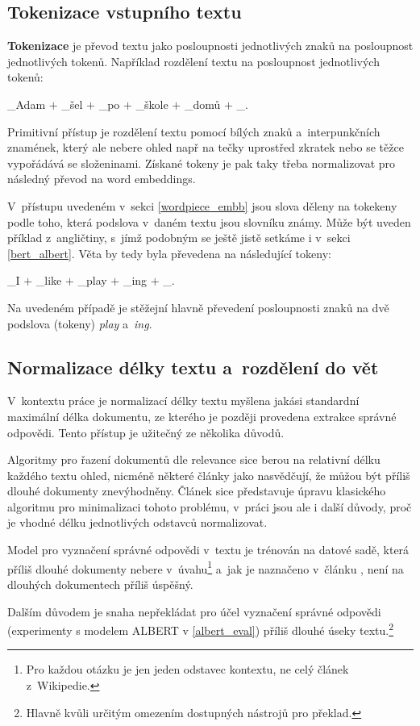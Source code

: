 \subsection{Tokenizace vstupního textu}
\textbf{Tokenizace} je převod textu jako posloupnosti jednotlivých znaků na posloupnost jednotlivých tokenů. Například rozdělení textu  na posloupnost jednotlivých tokenů:
\begin{center}
    \_Adam $+$ \_šel $+$ \_po $+$ \_škole $+$ \_domů $+$ \_.
\end{center}
Primitivní přístup je rozdělení textu pomocí bílých znaků a~interpunkčních znamének, který ale nebere ohled např na tečky uprostřed zkratek nebo se těžce vypořádává se složeninami. Získané tokeny je pak taky třeba normalizovat pro následný převod na word embeddings.\par
V~přístupu uvedeném v~sekci \ref{wordpiece_embb} jsou slova děleny na tokekeny podle toho, která podslova v~daném textu jsou slovníku známy. Může být uveden příklad z~angličtiny, s~jímž podobným se ještě jistě setkáme i v~sekci \ref{bert_albert}. Věta  by tedy byla převedena na následující tokeny:
\begin{center}
    \_I $+$ \_like $+$ \_play $+$ \_ing $+$ \_.
\end{center}
Na uvedeném případě je stěžejní hlavně převedení posloupnosti znaků  na dvě podslova (tokeny) \emph{play} a~\emph{ing}.

\subsection{Normalizace délky textu a~rozdělení do vět}
V~kontextu práce je normalizací délky textu myšlena jakási standardní maximální délka dokumentu, ze kterého je později provedena extrakce správné odpovědi. Tento přístup je užitečný ze několika důvodů.\par
Algoritmy pro řazení dokumentů dle relevance sice berou na relativní délku každého textu ohled, nicméně některé články jako \cite{bm25_too_long} nasvědčují, že můžou být příliš dlouhé dokumenty znevýhodněny. Článek \cite{bm25_too_long} sice představuje úpravu klasického algoritmu pro minimalizaci tohoto problému, v~práci jsou ale i další důvody, proč je vhodné délku jednotlivých odstavců normalizovat.\par
Model pro vyznačení správné odpovědi v~textu je trénován na datové sadě, která příliš dlouhé dokumenty nebere v~úvahu\footnote{Pro každou otázku je jen jeden odstavec kontextu, ne celý článek z~Wikipedie.} a~jak je naznačeno v~článku \cite{QA_long_multiple_span}, není na dlouhých dokumentech příliš úspěšný.\par
Dalším důvodem je snaha nepřekládat pro účel vyznačení správné odpovědi (experimenty s modelem ALBERT v \ref{albert_eval}) příliš dlouhé úseky textu.\footnote{Hlavně kvůli určitým omezením dostupných nástrojů pro překlad.}

